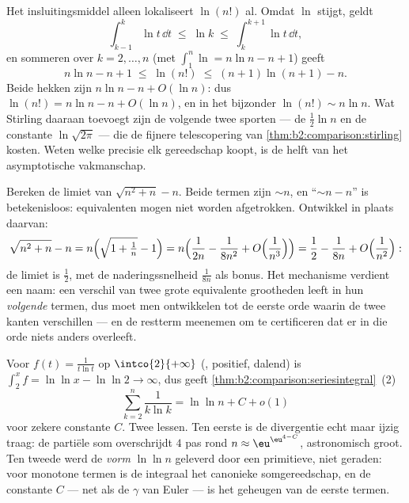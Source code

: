 \begin{example}\label{ex:b2:comparison:lnfactorial}
Het insluitingsmiddel alleen lokaliseert $\ln(n!)$ al. Omdat $\ln$
stijgt, geldt
\[
\int_{k-1}^{k}\ln t\,\dd t \;\leq\; \ln k \;\leq\;
\int_{k}^{k+1}\ln t\,\dd t ,
\]
en sommeren over $k = 2, \dots, n$ (met $\int_1^n\ln = n\ln n - n
+ 1$) geeft
\[
n\ln n - n + 1 \;\leq\; \ln(n!) \;\leq\; (n+1)\ln(n+1) - n .
\]
Beide hekken zijn $n\ln n - n + O(\ln n)$: dus $\ln(n!) = n\ln n -
n + O(\ln n)$, en in het bijzonder $\ln(n!) \sim n\ln n$. Wat
Stirling daaraan toevoegt zijn de volgende twee sporten --- de
$\frac12\ln n$ en de constante $\ln\sqrt{2\pi}$ --- die de fijnere
telescopering van \cref{thm:b2:comparison:stirling} kosten. Weten
welke precisie elk gereedschap koopt, is de helft van het
asymptotische vakmanschap.
\end{example}

\begin{example}\label{ex:b2:comparison:cancellation}
Bereken de limiet van $\sqrt{n^2 + n} - n$. Beide termen zijn
$\sim n$, en ``$\sim n - n$'' is betekenisloos: equivalenten
mogen niet worden afgetrokken. Ontwikkel in plaats daarvan:
\[
\sqrt{n^2 + n} - n
= n\Bigl(\sqrt{1 + \tfrac1n} - 1\Bigr)
= n\Bigl(\frac{1}{2n} - \frac{1}{8n^2} +
O\Bigl(\frac1{n^3}\Bigr)\Bigr)
= \frac12 - \frac{1}{8n} + O\Bigl(\frac{1}{n^2}\Bigr) :
\]
de limiet is $\frac12$, met de naderingssnelheid $\frac1{8n}$ als
bonus. Het mechanisme verdient een naam: een verschil van twee
grote equivalente grootheden leeft  in hun \emph{volgende}
termen, dus moet men ontwikkelen tot de eerste orde waarin de twee
kanten verschillen --- en de restterm meenemen om te certificeren
dat er in die orde niets anders overleeft.
\end{example}

\begin{example}\label{ex:b2:comparison:loglog}
Voor $f(t) = \frac{1}{t\ln t}$ op $\intco{2}{+\infty}$ (,
positief, dalend) is $\int_2^x f = \ln\ln x - \ln\ln 2 \to
\infty$, dus geeft \cref{thm:b2:comparison:seriesintegral}~(2)
\[
\sum_{k=2}^{n}\frac{1}{k\ln k} = \ln\ln n + C + o(1)
\]
voor zekere constante $C$. Twee lessen. Ten eerste is de
divergentie echt maar ijzig traag: de partiële som overschrijdt
$4$ pas rond $n \approx \eu^{\eu^{4 - C}}$, astronomisch groot.
Ten tweede werd de \emph{vorm} $\ln\ln n$ geleverd door een
primitieve, niet geraden: voor monotone termen is de integraal het
canonieke somgereedschap, en de constante $C$ --- net als de
$\gamma$ van Euler --- is het geheugen van de eerste termen.
\end{example}

